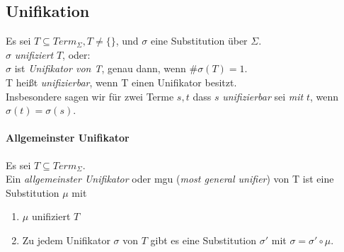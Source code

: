 \documentclass{article}
\begin{document}
\subsection{Unifikation}
Es sei $T \subseteq Term_\Sigma, T \neq \{\}$, und $\sigma$ eine Substitution
\"uber $\Sigma$. \\
$\sigma$ \textit{unifiziert} $T$, oder: \\
$\sigma$ ist \textit{Unifikator von T},
genau dann, wenn $\#\sigma(T) = 1$. \\
T hei{\ss}t \textit{unifizierbar}, wenn T einen Unifikator besitzt. \\
Insbesondere sagen wir f\"ur zwei Terme $s, t$ dass $s$ \textit{unifizierbar}
sei \textit{mit} $t$, wenn $\sigma(t) = \sigma(s)$.

\paragraph{Allgemeinster Unifikator} 
Es sei $T \subseteq Term_\Sigma$. \\
Ein \textit{allgemeinster Unifikator} oder mgu (\textit{most general unifier}) von T ist eine Substitution $\mu$ mit
\begin{enumerate}
        \item $\mu$ unifiziert $T$
    \item Zu jedem Unifikator $\sigma$ von $T$ gibt es eine Substitution
        $\sigma'$ mit $\sigma = \sigma' \circ \mu$.
\end{enumerate}
\end{document}
